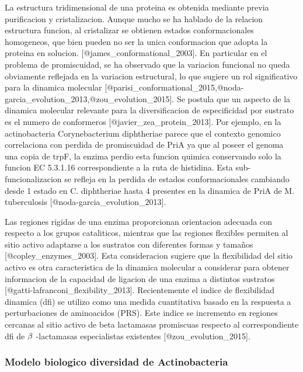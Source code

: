 \documentclass[]{article}
\begin{document}
La estructura tridimensional de una proteina es obtenida mediante previa
purificacion y cristalizacion. Aunque mucho se ha hablado de la relacion
estructura funcion, al cristalizar se obtienen estados conformacionales
homogeneos, que bien pueden no ser la unica conformacion que adopta la
proteina en solucion. {[}@james\_conformational\_2003{]}. En particular
en el problema de promiscuidad, se ha observado que la variacion
funcional no queda obviamente reflejada en la variacion estructural, lo
que sugiere un rol significativo para la dinamica molecular
{[}@parisi\_conformational\_2015,@noda-garcia\_evolution\_2013,@zou\_evolution\_2015{]}.
Se postula que un aspecto de la dinamica molecular relevante para la
diversificacion de especificidad por sustrato es el numero de
conformeros {[}@javier\_zea\_protein\_2013{]}. Por ejemplo, en la
actinobacteria Corynebacterium diphtheriae parece que el contexto
genomico correlaciona con perdida de promiscuidad de PriA ya que al
poseer el genoma una copia de trpF, la enzima perdio esta funcion
quimica conservando solo la funcion EC 5.3.1.16 correspondiente a la
ruta de histidina. Esta sub-funcionalizacion se refleja en la perdida de
estados conformacionales cambiando desde 1 estado en C. diphtheriae
hasta 4 presentes en la dinamica de PriA de M. tuberculosis
{[}@noda-garcia\_evolution\_2013{]}.

Las regiones rigidas de una enzima proporcionan orientacion adecuada con
respecto a los grupos cataliticos, mientras que las regiones flexibles
permiten al sitio activo adaptarse a los sustratos con diferentes formas
y tamaños {[}@copley\_enzymes\_2003{]}. Esta consideracion sugiere que
la flexibilidad del sitio activo es otra caracteristica de la dinamica
molecular a considerar para obtener informacion de la capacidad de
ligacion de una enzima a distintos sustratos
{[}@gatti-lafranconi\_flexibility\_2013{]}. Recientemente el indice de
flexibilidad dinamica (dfi) se utilizo como una medida cuantitativa
basado en la respuesta a perturbaciones de aminoacidos (PRS). Este
indice se incremento en regiones cercanas al sitio activo de beta
lactamasas promiscuas respecto al correspondiente dfi de
\(\noindent\beta\) -lactamasas especialistas existentes
{[}@zou\_evolution\_2015{]}.

\subsubsection{Modelo biologico diversidad de
Actinobacteria}\label{modelo-biologico-diversidad-de-actinobacteria}
\end{document}
